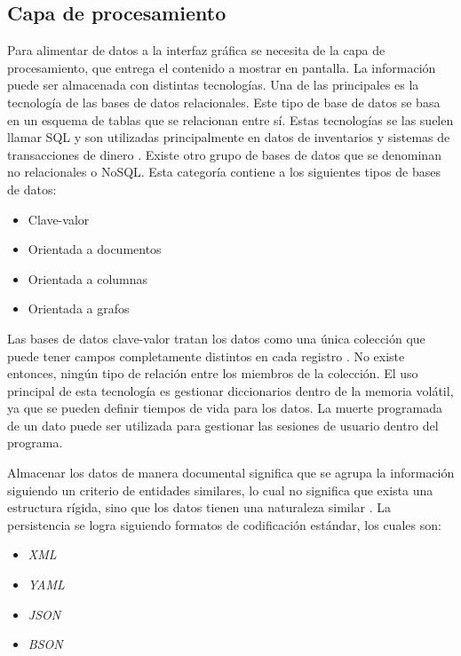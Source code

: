 \newpage

\subsection{Capa de procesamiento}
Para alimentar de datos a la interfaz gráfica se necesita de la capa de procesamiento, que entrega el contenido a mostrar en pantalla. La información puede ser almacenada con distintas tecnologías.
Una de las principales es la tecnología de las bases de datos relacionales.
Este tipo de base de datos se basa en un esquema de tablas que se relacionan entre sí.
Estas tecnologías se las suelen llamar SQL y son utilizadas principalmente en datos de inventarios y sistemas de transacciones de dinero \citep{munar2014big}.
Existe otro grupo de bases de datos que se denominan no relacionales o NoSQL.
Esta categoría contiene a los siguientes tipos de bases de datos:

\begin{itemize}
	\item Clave-valor
	\item Orientada a documentos
	\item Orientada a columnas
	\item Orientada a grafos
\end{itemize}

Las bases de datos clave-valor tratan los datos como una única colección que puede tener campos completamente distintos en cada registro \citep{nguyen2015zing}.
No existe entonces, ningún tipo de relación entre los miembros de la colección. El uso principal de esta tecnología es gestionar diccionarios dentro de la memoria volátil, ya que se pueden definir tiempos de vida para los datos. La muerte programada de un dato puede ser utilizada para gestionar las sesiones de usuario dentro del programa.

Almacenar los datos de manera documental significa que se agrupa la información siguiendo un criterio de entidades similares, lo cual no significa que exista una estructura rígida, sino que los datos tienen una naturaleza similar \citep{gutierrez2019herramienta}.
La persistencia se logra siguiendo formatos de codificación estándar, los cuales son:

\begin{itemize}
	\item \emph{XML}
	\item \emph{YAML}
	\item \emph{JSON}
	\item \emph{BSON}
\end{itemize}

